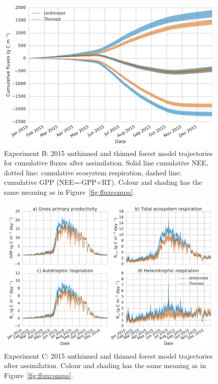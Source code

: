 \documentclass[draft,jgrga]{agutexSI}
\begin{document}
  \begin{figure}
 \noindent\includegraphics[width=40pc]{cum_fluxb.pdf}
\caption{Experiment B: 2015 unthinned and thinned forest model trajectories for cumulative fluxes after assimilation. Solid line cumulative NEE, dotted line: cumulative ecosystem respiration, dashed line: cumulative GPP (NEE=-GPP+RT). Colour and shading has the same meaning as in Figure~\ref{fig:fluxcompa}.}
 \label{fig:fluxcumb}
 \end{figure}
 
  \begin{figure}
 \noindent\includegraphics[width=40pc]{flux_compc.pdf}
\caption{Experiment C: 2015 unthinned and thinned forest model trajectories after assimilation. Colour and shading has the same meaning as in Figure~\ref{fig:fluxcompa}.}
 \label{fig:fluxcompc}
 \end{figure}
 
\end{document}
